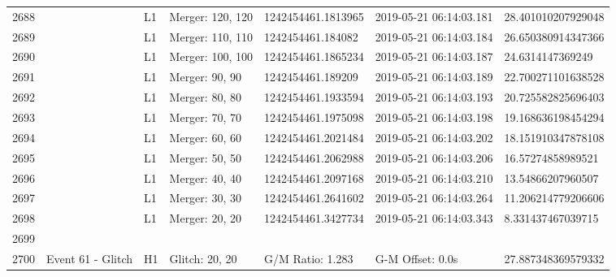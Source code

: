 \begin{longtable}{lllllll}
2688 &                                                    &       L1 &  Merger: 120, 120 &  1242454461.1813965 &  2019-05-21 06:14:03.181 &  28.401010207929048 \\
2689 &                                                    &       L1 &  Merger: 110, 110 &   1242454461.184082 &  2019-05-21 06:14:03.184 &  26.650380914347366 \\
2690 &                                                    &       L1 &  Merger: 100, 100 &  1242454461.1865234 &  2019-05-21 06:14:03.187 &    24.6314147369249 \\
2691 &                                                    &       L1 &    Merger: 90, 90 &   1242454461.189209 &  2019-05-21 06:14:03.189 &  22.700271101638528 \\
2692 &                                                    &       L1 &    Merger: 80, 80 &  1242454461.1933594 &  2019-05-21 06:14:03.193 &  20.725582825696403 \\
2693 &                                                    &       L1 &    Merger: 70, 70 &  1242454461.1975098 &  2019-05-21 06:14:03.198 &  19.168636198454294 \\
2694 &                                                    &       L1 &    Merger: 60, 60 &  1242454461.2021484 &  2019-05-21 06:14:03.202 &  18.151910347878108 \\
2695 &                                                    &       L1 &    Merger: 50, 50 &  1242454461.2062988 &  2019-05-21 06:14:03.206 &   16.57274858989521 \\
2696 &                                                    &       L1 &    Merger: 40, 40 &  1242454461.2097168 &  2019-05-21 06:14:03.210 &   13.54866207960507 \\
2697 &                                                    &       L1 &    Merger: 30, 30 &  1242454461.2641602 &  2019-05-21 06:14:03.264 &  11.206214779206606 \\
2698 &                                                    &       L1 &    Merger: 20, 20 &  1242454461.3427734 &  2019-05-21 06:14:03.343 &   8.331437467039715 \\
2699 &                                                    &          &                   &                     &                          &                     \\
2700 &                                  Event 61 - Glitch &       H1 &    Glitch: 20, 20 &    G/M Ratio: 1.283 &         G-M Offset: 0.0s &  27.887348369579332 \\

\end{longtable}
